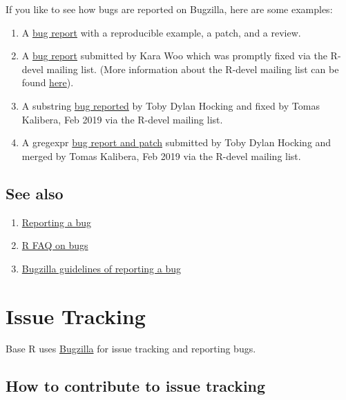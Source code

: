 \documentclass[
]{book}
\begin{document}
If you like to see how bugs are reported on Bugzilla, here are some examples:

\begin{enumerate}
\def\labelenumi{\arabic{enumi}.}
\item
  A \href{https://bugs.r-project.org/bugzilla/show_bug.cgi?id=17767}{bug report} with a reproducible example, a patch, and a review.
\item
  A \href{https://stat.ethz.ch/pipermail/r-devel/2019-May/077855.html}{bug report} submitted by Kara Woo which was promptly fixed via the R-devel mailing list. (More information about the R-devel mailing list can be found \href{https://stat.ethz.ch/mailman/listinfo/r-devel}{here}).
\item
  A substring \href{https://stat.ethz.ch/pipermail/r-devel/2019-February/077393.html}{bug reported} by Toby Dylan Hocking and fixed by Tomas Kalibera, Feb 2019 via the R-devel mailing list.
\item
  A gregexpr \href{https://stat.ethz.ch/pipermail/r-devel/2019-February/077315.html}{bug report and patch} submitted by Toby Dylan Hocking and merged by Tomas Kalibera, Feb 2019 via the R-devel mailing list.
\end{enumerate}

\hypertarget{see-also-1}{%
\section{See also}\label{see-also-1}}

\begin{enumerate}
\def\labelenumi{\arabic{enumi}.}
\item
  \href{https://www.r-project.org/bugs.html}{Reporting a bug}
\item
  \href{https://mac.r-project.org/man/R-FAQ.html\#R-Bugs}{R FAQ on bugs}
\item
  \href{https://bugs.r-project.org/bugzilla/page.cgi?id=bug-writing.html}{Bugzilla guidelines of reporting a bug}
\end{enumerate}

\hypertarget{IssueTrack}{%
\chapter{Issue Tracking}\label{IssueTrack}}

Base R uses \href{https://bugs.r-project.org/}{Bugzilla} for issue tracking and reporting bugs.

\hypertarget{how-to-contribute-to-issue-tracking}{%
\section{How to contribute to issue tracking}\label{how-to-contribute-to-issue-tracking}}
\end{document}
